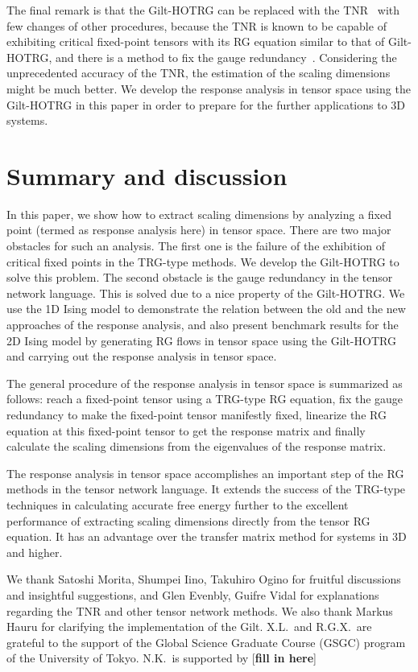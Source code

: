 \documentclass[aps,prb,reprint,superscriptaddress,floatfix]{revtex4-2}
\begin{document}
The final remark is that the Gilt-HOTRG can be replaced with
the TNR~\cite{tnr,tnralgo} with few changes of other procedures, because
the TNR is known to be capable of exhibiting critical fixed-point
tensors with its RG equation similar to that of Gilt-HOTRG, and there is
a method to fix the gauge redundancy~\cite{tnralgo}. Considering the
unprecedented accuracy of the TNR, the estimation of the scaling dimensions
might be much better. We develop the response analysis in tensor space
using the Gilt-HOTRG in this paper in order to prepare for the further
applications to 3D systems.
%


\section{Summary and discussion\label{conclusion}}
In this paper, we show how to extract scaling dimensions by analyzing a
fixed point (termed as response analysis here) in tensor space. There are two
major obstacles for such an analysis. The first one is the failure of
the exhibition of critical fixed points in the TRG-type methods. We develop
the Gilt-HOTRG to solve this problem. The second obstacle is the
gauge redundancy in the tensor network language. This is solved due to a
nice property of the Gilt-HOTRG.  We use the 1D Ising model to demonstrate
the relation between the old and the new approaches of the response
analysis, and also present benchmark results for the 2D Ising model
by generating RG flows in tensor space using the Gilt-HOTRG and carrying out
the response analysis in tensor space. 
%

The general procedure of the response analysis in tensor space is summarized
as follows: reach a fixed-point tensor using a TRG-type RG equation, fix
the gauge redundancy to make the fixed-point tensor manifestly fixed,
linearize the RG equation at this fixed-point tensor to get the response
matrix and finally calculate the scaling dimensions from the
eigenvalues of the response matrix.
%

The response analysis in tensor space accomplishes an important step of
the RG methods in the tensor network language. It extends the success of
the TRG-type techniques in calculating accurate free energy further to
the excellent performance of extracting scaling dimensions directly from
the tensor RG equation. It has an advantage over the transfer matrix
method for systems in 3D and higher. 




\begin{acknowledgments}
We thank Satoshi Morita, Shumpei Iino, Takuhiro Ogino for fruitful
discussions and insightful suggestions, and Glen Evenbly, Guifre Vidal
for explanations regarding the TNR and other tensor network methods. We
also thank Markus Hauru for clarifying the implementation of the Gilt.
X.L.\ and R.G.X.\ are grateful to the support of the Global Science
Graduate Course (GSGC) program of the University of Tokyo. N.K.\ is
supported by [\textbf{fill in here}]

\end{acknowledgments}
\end{document}
